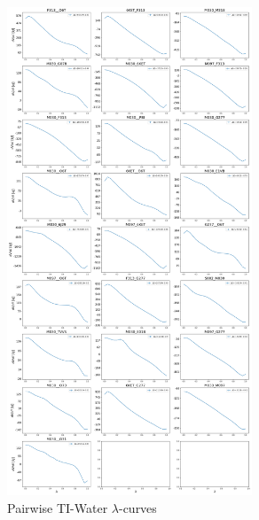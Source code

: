\begin{figure}
    \centering
    \includegraphics[width=0.65\textwidth]{fig/SI/dG_convergence/TI_water_lambda_curves.png}
    \caption{Pairwise TI-Water $\lambda$-curves}
    \label{SIfig:TI_water_curve}
\end{figure}

